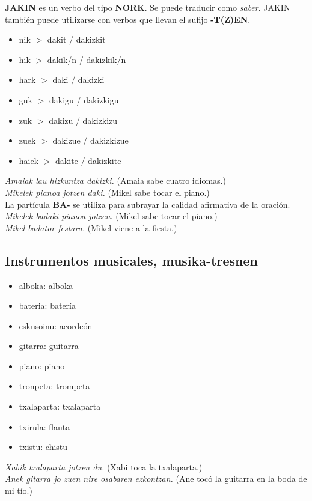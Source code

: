 \documentclass[11pt, a4paper]{article}
\begin{document}
\noindent \textbf{JAKIN} es un verbo del tipo \textbf{NORK}. Se puede traducir como \textit{saber}. JAKIN también puede utilizarse con verbos que llevan el sufijo \textbf{-T(Z)EN}.
\begin{multicols}{2}
\begin{itemize}
\item nik $>$ dakit / dakizkit
\item hik $>$ dakik/n / dakizkik/n
\item hark $>$ daki / dakizki
\item guk $>$ dakigu / dakizkigu
\item zuk $>$ dakizu / dakizkizu
\item zuek $>$ dakizue / dakizkizue
\item haiek $>$ dakite / dakizkite
\end{itemize}
\end{multicols}
\indent \textit{Amaiak lau hizkuntza dakizki.} (Amaia sabe cuatro idiomas.)\\
\indent \textit{Mikelek pianoa jotzen daki.} (Mikel sabe tocar el piano.)\\

\noindent La partícula \textbf{BA-} se utiliza para subrayar la calidad afirmativa de la oración.\\
\indent \textit{Mikelek badaki pianoa jotzen.} (Mikel sabe tocar el piano.)\\
\indent \textit{Mikel badator festara.} (Mikel viene a la fiesta.)\\

\subsection{Instrumentos musicales, musika-tresnen}
\begin{multicols}{2}
\begin{itemize}
\item alboka: alboka
\item bateria: batería
\item eskusoinu: acordeón
\item gitarra: guitarra
\item piano: piano
\item tronpeta: trompeta
\item txalaparta: txalaparta
\item txirula: flauta
\item txistu: chistu
\end{itemize}
\end{multicols}
\indent \textit{Xabik txalaparta jotzen du.} (Xabi toca la txalaparta.)\\
\indent \textit{Anek gitarra jo zuen nire osabaren ezkontzan.} (Ane tocó la guitarra en la boda de mi tío.)
\end{document}
